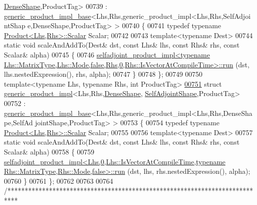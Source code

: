 \begin{DoxyCode}
      \hyperlink{struct_eigen_1_1_dense_shape}{DenseShape},ProductTag>
00739   : \hyperlink{struct_eigen_1_1internal_1_1generic__product__impl__base}{generic\_product\_impl\_base}<Lhs,Rhs,generic\_product\_impl<Lhs,Rhs,SelfAdjointShap
      e,DenseShape,ProductTag> >
00740 \{
00741   \textcolor{keyword}{typedef} \textcolor{keyword}{typename} \hyperlink{group___core___module_class_eigen_1_1_product}{Product<Lhs,Rhs>::Scalar} Scalar;
00742   
00743   \textcolor{keyword}{template}<\textcolor{keyword}{typename} Dest>
00744   \textcolor{keyword}{static} \textcolor{keywordtype}{void} scaleAndAddTo(Dest& dst, \textcolor{keyword}{const} Lhs& lhs, \textcolor{keyword}{const} Rhs& rhs, \textcolor{keyword}{const} Scalar& alpha)
00745   \{
00746     
      \hyperlink{struct_eigen_1_1internal_1_1selfadjoint__product__impl}{selfadjoint\_product\_impl<typename Lhs::MatrixType,Lhs::Mode,false,Rhs,0,Rhs::IsVectorAtCompileTime>::run}
      (dst, lhs.nestedExpression(), rhs, alpha);
00747   \}
00748 \};
00749 
00750 \textcolor{keyword}{template}<\textcolor{keyword}{typename} Lhs, \textcolor{keyword}{typename} Rhs, \textcolor{keywordtype}{int} ProductTag>
\hyperlink{struct_eigen_1_1internal_1_1generic__product__impl_3_01_lhs_00_01_rhs_00_01_dense_shape_00_01_se2e8cb7106d8225767d620f93988c2a09}{00751} \textcolor{keyword}{struct }\hyperlink{struct_eigen_1_1internal_1_1generic__product__impl}{generic\_product\_impl}<Lhs,Rhs,\hyperlink{struct_eigen_1_1_dense_shape}{DenseShape},
      \hyperlink{struct_eigen_1_1_self_adjoint_shape}{SelfAdjointShape},ProductTag>
00752 : \hyperlink{struct_eigen_1_1internal_1_1generic__product__impl__base}{generic\_product\_impl\_base}<Lhs,Rhs,generic\_product\_impl<Lhs,Rhs,DenseShape,SelfAd
      jointShape,ProductTag> >
00753 \{
00754   \textcolor{keyword}{typedef} \textcolor{keyword}{typename} \hyperlink{group___core___module_class_eigen_1_1_product}{Product<Lhs,Rhs>::Scalar} Scalar;
00755   
00756   \textcolor{keyword}{template}<\textcolor{keyword}{typename} Dest>
00757   \textcolor{keyword}{static} \textcolor{keywordtype}{void} scaleAndAddTo(Dest& dst, \textcolor{keyword}{const} Lhs& lhs, \textcolor{keyword}{const} Rhs& rhs, \textcolor{keyword}{const} Scalar& alpha)
00758   \{
00759     
      \hyperlink{struct_eigen_1_1internal_1_1selfadjoint__product__impl}{selfadjoint\_product\_impl<Lhs,0,Lhs::IsVectorAtCompileTime,typename Rhs::MatrixType,Rhs::Mode,false>::run}
      (dst, lhs, rhs.nestedExpression(), alpha);
00760   \}
00761 \};
00762 
00763 
00764 \textcolor{comment}{/***************************************************************************}

\end{DoxyCode}
